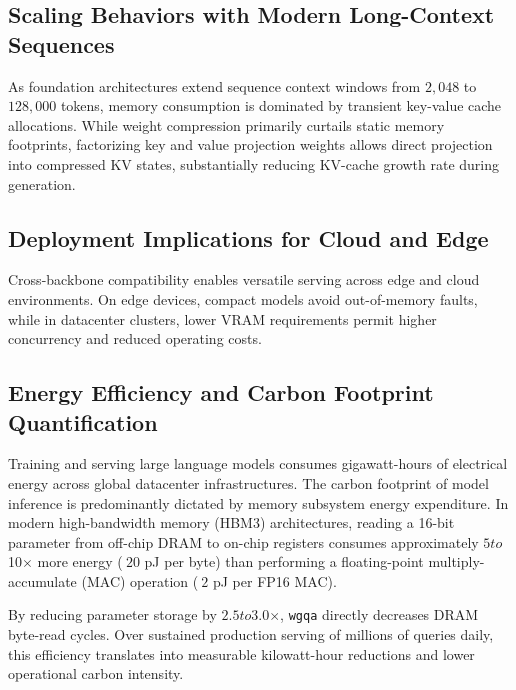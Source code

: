 \subsection{Scaling Behaviors with Modern Long-Context Sequences}
As foundation architectures extend sequence context windows from $2{,}048$ to $128{,}000$ tokens, memory consumption is dominated by transient key-value cache allocations. While weight compression primarily curtails static memory footprints, factorizing key and value projection weights allows direct projection into compressed KV states, substantially reducing KV-cache growth rate during generation.

\subsection{Deployment Implications for Cloud and Edge}
Cross-backbone compatibility enables versatile serving across edge and cloud environments. On edge devices, compact models avoid out-of-memory faults, while in datacenter clusters, lower VRAM requirements permit higher concurrency and reduced operating costs.

\subsection{Energy Efficiency and Carbon Footprint Quantification}
Training and serving large language models consumes gigawatt-hours of electrical energy across global datacenter infrastructures. The carbon footprint of model inference is predominantly dictated by memory subsystem energy expenditure. In modern high-bandwidth memory (HBM3) architectures, reading a 16-bit parameter from off-chip DRAM to on-chip registers consumes approximately $5$\times$ to $10$\times$ more energy ($~20$ pJ per byte) than performing a floating-point multiply-accumulate (MAC) operation ($~2$ pJ per FP16 MAC).

By reducing parameter storage by $2.5$\times$ to $3.0$\times$, \texttt{wgqa} directly decreases DRAM byte-read cycles. Over sustained production serving of millions of queries daily, this efficiency translates into measurable kilowatt-hour reductions and lower operational carbon intensity.

